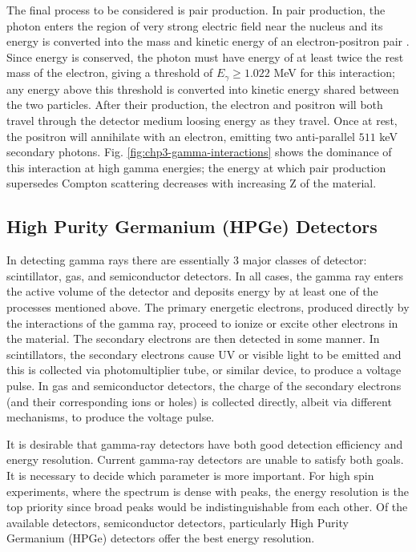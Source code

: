 The final process to be considered is pair production. In pair production, the photon enters the region of very strong electric field near the nucleus and its energy is converted into the mass and kinetic energy of an electron-positron pair \cite{anderson-PhysRev.43.491,oppenheimer_PhysRev.44.53.2}. Since energy is conserved, the photon must have energy of at least twice the rest mass of the electron, giving a threshold of $E_{\gamma}\geq1.022$ MeV for this interaction; any energy above this threshold is converted into kinetic energy shared between the two particles. After their production, the electron and positron will both travel through the detector medium loosing energy as they travel. Once at rest, the positron will annihilate with an electron, emitting two anti-parallel $511$ keV secondary photons. Fig. \ref{fig:chp3-gamma-interactions} shows the dominance of this interaction at high gamma energies; the energy at which pair production supersedes Compton scattering decreases with increasing Z of the material.

\subsection{High Purity Germanium (HPGe) Detectors}
\label{ssec:exp-pr-gamma-spec-hpge}
In detecting gamma rays there are essentially 3 major classes of detector: scintillator, gas, and semiconductor detectors. In all cases, the gamma ray enters the active volume of the detector and deposits energy by at least one of the processes mentioned above. The primary energetic electrons, produced directly by the interactions of the gamma ray, proceed to ionize or excite other electrons in the material. The secondary electrons are then detected in some manner. In scintillators, the secondary electrons cause UV or visible light to be emitted and this is collected via photomultiplier tube, or similar device, to produce a voltage pulse. In gas and semiconductor detectors, the charge of the secondary electrons (and their corresponding ions or holes) is collected directly, albeit via different mechanisms, to produce the voltage pulse.

It is desirable that gamma-ray detectors have both good detection efficiency and energy resolution. Current gamma-ray detectors are unable to satisfy both goals. It is necessary to decide which parameter is more important. For high spin experiments, where the spectrum is dense with peaks, the energy resolution is the top priority since broad peaks would be indistinguishable from each other. Of the available detectors, semiconductor detectors, particularly High Purity Germanium (HPGe) detectors offer the best energy resolution.

